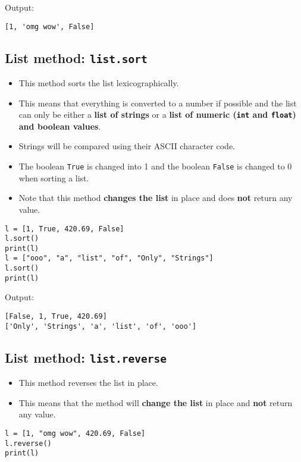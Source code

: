 \documentclass[11pt]{article}
\begin{document}
 \noindent Output:

\begin{verbatim}
[1, 'omg wow', False]
\end{verbatim}

\subsection{List method: \texttt{list.sort}}
\label{sec:org09fb7f8}
\begin{itemize}
\item This method sorts the list lexicographically.
\item This means that everything is converted to a number if possible and the list can only be either a \textbf{list of strings} or a \textbf{list of numeric (\texttt{int} and \texttt{float}) and boolean values}.
\item Strings will be compared using their ASCII character code.
\item The boolean \texttt{True} is changed into 1 and the boolean \texttt{False} is changed to 0 when sorting a list.
\item Note that this method \textbf{changes the list} in place and does \textbf{not} return any value.
\end{itemize}

\begin{verbatim}
l = [1, True, 420.69, False]
l.sort()
print(l)
l = ["ooo", "a", "list", "of", "Only", "Strings"]
l.sort()
print(l)
\end{verbatim}

 \noindent Output:

\begin{verbatim}
[False, 1, True, 420.69]
['Only', 'Strings', 'a', 'list', 'of', 'ooo']
\end{verbatim}

\subsection{List method: \texttt{list.reverse}}
\label{sec:orge1c63ca}
\begin{itemize}
\item This method reverses the list in place.
\item This means that the method will \textbf{change the list} in place and \textbf{not} return any value.
\end{itemize}
\begin{verbatim}
l = [1, "omg wow", 420.69, False]
l.reverse()
print(l)
\end{verbatim}
\end{document}
